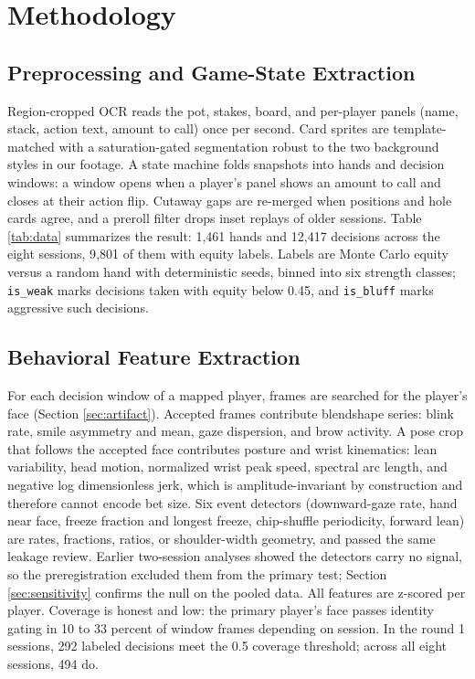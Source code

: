 \documentclass[conference]{IEEEtran}
\begin{document}
\section{Methodology}

\subsection{Preprocessing and Game-State Extraction}
Region-cropped OCR reads the pot, stakes, board, and
per-player panels (name, stack, action text, amount to call) once per
second. Card sprites are template-matched with a saturation-gated
segmentation robust to the two background styles in our footage. A state
machine folds snapshots into hands and decision windows: a window opens
when a player's panel shows an amount to call and closes at their action
flip. Cutaway gaps are re-merged when positions and hole cards agree, and
a preroll filter drops inset replays of older sessions. Table
\ref{tab:data} summarizes the result: 1{,}461 hands and 12{,}417
decisions across the eight sessions, 9{,}801 of them with equity labels.
Labels are Monte Carlo equity versus a random hand with deterministic
seeds, binned into six strength classes; \texttt{is\_weak} marks
decisions taken with equity below 0.45, and \texttt{is\_bluff} marks
aggressive such decisions.

\subsection{Behavioral Feature Extraction}
For each decision window of a mapped player, frames are searched for the
player's face (Section \ref{sec:artifact}). Accepted frames contribute
blendshape series: blink rate, smile asymmetry and mean, gaze dispersion,
and brow activity. A pose crop that follows the accepted face contributes
posture and wrist kinematics: lean variability, head motion, normalized
wrist peak speed, spectral arc length, and negative log dimensionless
jerk, which is amplitude-invariant by construction and therefore cannot
encode bet size. Six event detectors (downward-gaze rate, hand near face,
freeze fraction and longest freeze, chip-shuffle periodicity, forward
lean) are rates, fractions, ratios, or shoulder-width geometry, and
passed the same leakage review. Earlier two-session analyses showed the
detectors carry no signal, so the preregistration excluded them from the
primary test; Section \ref{sec:sensitivity} confirms the null on the
pooled data. All features are z-scored per player. Coverage is honest and
low: the primary player's face passes identity gating in 10 to 33 percent
of window frames depending on session. In the round 1 sessions, 292
labeled decisions meet the 0.5 coverage threshold; across all eight
sessions, 494 do.
\end{document}

